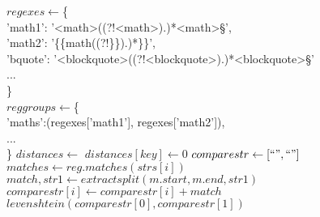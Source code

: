 \begin{algorithmic}
  \State $regexes \gets $\{\\
    'math1': '<math>((?!<\/math>).)*<\/math>\S',\\
    'math2': '\{\{math((?!\}\}).)*\}\}',\\
    'bquote': '<blockquote>((?!<\/blockquote>).)*<\/blockquote>\S'\\
    ...\\
  \}\\
  \State $reggroups \gets $\{\\
    'maths':(regexes['math1'], regexes['math2']),\\
    ...\\
  \}
  \State $distances \gets {}$
  \State $distances[key] \gets 0$
  \State $comparestr \gets [``", ``"]$
  \State $matches \gets reg.matches(strs[i])$
  \State $match, str1 \gets extractsplit(m.start, m.end, str1)$
  \State $comparestr[i] \gets comparestr[i] + match$
  \EndFor
  \EndFor
  \State $levenshtein(comparestr[0], comparestr[1])$
  \EndIf
  \EndFor
\end{algorithmic}
